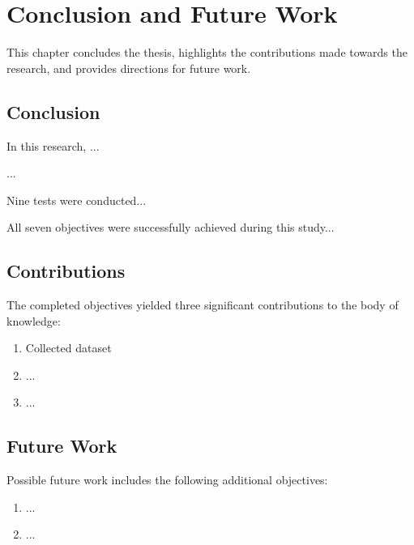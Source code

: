 
\chapter{Conclusion and Future Work} %
\label{Chapter6}


This chapter concludes the thesis, highlights the contributions made towards the research, and provides directions for future work.


\section{Conclusion}

    In this research, ...
    
    ...
    
    
    
    Nine tests were conducted...
    
    All seven objectives were successfully achieved during this study...

\section{Contributions}

   The completed objectives yielded three significant contributions to the body of knowledge:
    
      \begin{enumerate}
        \item Collected dataset
        \item ...
        \item ...
    \end{enumerate}

\section{Future Work}
    Possible future work includes the following additional objectives:

\begin{enumerate}
    \item ... 
    \item ...
   
\end{enumerate}

